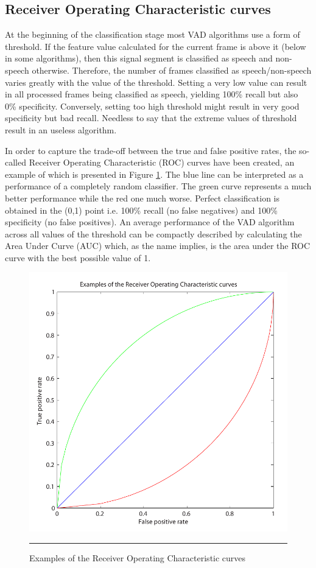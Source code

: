 \subsection{Receiver Operating Characteristic curves}

At the beginning of the classification stage most VAD algorithms use a form of threshold. If the feature value calculated for the current frame is above it (below in some algorithms), then this signal segment is classified as speech and non-speech otherwise. Therefore, the number of frames classified as speech/non-speech varies greatly with the value of the threshold. Setting a very low value can result in all processed frames being classified as speech, yielding 100\% recall but also 0\% specificity. Conversely, setting too high threshold might result in very good specificity but bad recall. Needless to say that the extreme values of threshold result in an useless algorithm.

In order to capture the trade-off between the true and false positive rates, the so-called Receiver Operating Characteristic (ROC) curves have been created, an example of which is presented in Figure \ref{fig:roc}. The blue line can be interpreted as a performance of a completely random classifier. The green curve represents a much better performance while the red one much worse. Perfect classification is obtained in the (0,1) point i.e. 100\% recall (no false negatives) and 100\% specificity (no false positives). An average performance of the VAD algorithm across all values of the threshold can be compactly described by calculating the Area Under Curve (AUC) which, as the name implies, is the area under the ROC curve with the best possible value of 1.

\begin{figure}[htbp]
	\centering
		\includegraphics[width=0.55\columnwidth]{Figures/Chapter4/roc.pdf}
		\rule{37em}{0.5pt}
	\caption[Examples of the Receiver Operating Characteristic curves]{Examples of the Receiver Operating Characteristic curves}
	\label{fig:roc}
\end{figure}

